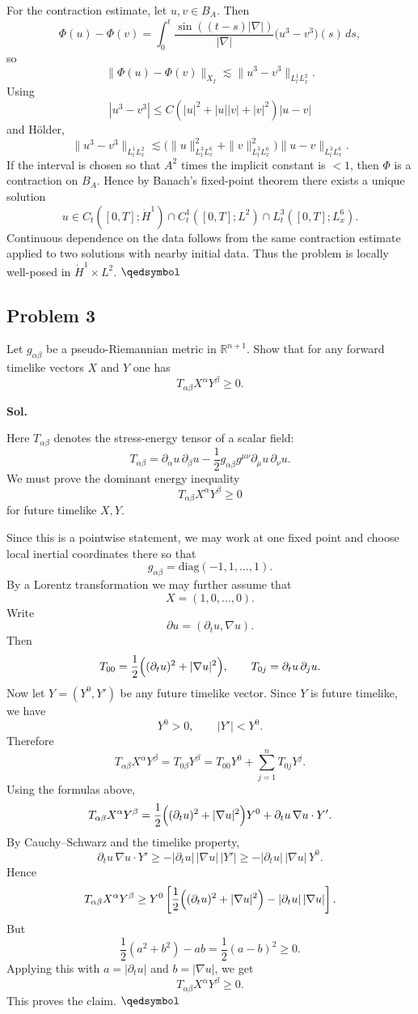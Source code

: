 \documentclass[lang=en,11pt,a4paper,citestyle=authoryear]{elegantpaper}
\newcommand{\prvd}{$\hfill \qedsymbol$}
\newcommand{\R}{\mathbb{R}}
\newcommand{\1}{\mathbbm{1}}
\begin{document}
For the contraction estimate, let $u,v\in B_A$. Then
\[
\Phi(u)-\Phi(v)=\int_0^t \frac{\sin((t-s)|\nabla|)}{|\nabla|}\bigl(u^3-v^3\bigr)(s)\,ds,
\]
so
\[
\|\Phi(u)-\Phi(v)\|_{X_I}
\lesssim \|u^3-v^3\|_{L_t^1L_x^2}.
\]
Using
\[
|u^3-v^3|\le C(|u|^2+|u||v|+|v|^2)|u-v|
\]
and H\"older,
\[
\|u^3-v^3\|_{L_t^1L_x^2}
\lesssim \bigl(\|u\|_{L_t^3L_x^6}^2+\|v\|_{L_t^3L_x^6}^2\bigr)\|u-v\|_{L_t^3L_x^6}.
\]
If the interval is chosen so that $A^2$ times the implicit constant is $<1$, then $\Phi$ is a contraction on $B_A$. Hence by Banach's fixed-point theorem there exists a unique solution
\[
u\in C_t([0,T];\dot H^1)\cap C_t^1([0,T];L^2)\cap L_t^3([0,T];L_x^6).
\]
Continuous dependence on the data follows from the same contraction estimate applied to two solutions with nearby initial data. Thus the problem is locally well-posed in $\dot H^1\times L^2$. \prvd

\vspace{0.5em}

\subsection*{Problem 3}
Let $g_{\alpha\beta}$ be a pseudo-Riemannian metric in $\R^{n+1}$. Show that for any forward timelike vectors $X$ and $Y$ one has
\[
T_{\alpha\beta}X^\alpha Y^\beta\ge 0.
\]

\vspace{0.5em}
\textbf{Sol.} \par
Here $T_{\alpha\beta}$ denotes the stress-energy tensor of a scalar field:
\[
T_{\alpha\beta}=\partial_\alpha u\,\partial_\beta u-\frac12 g_{\alpha\beta}g^{\mu\nu}\partial_\mu u\,\partial_\nu u.
\]
We must prove the dominant energy inequality
\[
T_{\alpha\beta}X^\alpha Y^\beta\ge 0
\]
for future timelike $X,Y$.

Since this is a pointwise statement, we may work at one fixed point and choose local inertial coordinates there so that
\[
g_{\alpha\beta}=\mathrm{diag}(-1,1,\dots,1).
\]
By a Lorentz transformation we may further assume that
\[
X=(1,0,\dots,0).
\]
Write
\[
\partial u=(\partial_tu,\nabla u).
\]
Then
\[
T_{00}=\frac12\Bigl((\partial_tu)^2+|\nabla u|^2\Bigr),
\qquad
T_{0j}=\partial_tu\,\partial_ju.
\]
Now let $Y=(Y^0,Y')$ be any future timelike vector. Since $Y$ is future timelike, we have
\[
Y^0>0,
\qquad |Y'|<Y^0.
\]
Therefore
\[
T_{\alpha\beta}X^\alpha Y^\beta=T_{0\beta}Y^\beta=T_{00}Y^0+\sum_{j=1}^nT_{0j}Y^j.
\]
Using the formulas above,
\[
T_{\alpha\beta}X^\alpha Y^\beta
=\frac12\Bigl((\partial_tu)^2+|\nabla u|^2\Bigr)Y^0+\partial_tu\,\nabla u\cdot Y'.
\]
By Cauchy--Schwarz and the timelike property,
\[
\partial_tu\,\nabla u\cdot Y'\ge -|\partial_tu|\,|\nabla u|\,|Y'|
\ge -|\partial_tu|\,|\nabla u|\,Y^0.
\]
Hence
\[
T_{\alpha\beta}X^\alpha Y^\beta
\ge Y^0\left[\frac12\Bigl((\partial_tu)^2+|\nabla u|^2\Bigr)-|\partial_tu|\,|\nabla u|\right].
\]
But
\[
\frac12(a^2+b^2)-ab=\frac12(a-b)^2\ge 0.
\]
Applying this with $a=|\partial_tu|$ and $b=|\nabla u|$, we get
\[
T_{\alpha\beta}X^\alpha Y^\beta\ge 0.
\]
This proves the claim. \prvd
\end{document}
